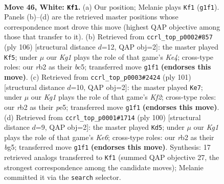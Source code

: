 \documentclass[11pt]{article}
\begin{document}
\clearpage

\begin{figure}[p]\centering
\begin{subfigure}{0.46\textwidth}\centering
\resizebox{\linewidth}{!}{%
\newchessgame
\chessboard[
  setfen={7k/8/8/4p1p1/5p2/5B2/1r6/6K1 w - - 3 46},
  showmover=false,
  pgfstyle=straightmove, color=movearrow, markmove={g1-f1}
]}
\caption{}
\end{subfigure}\hfill
\begin{subfigure}{0.46\textwidth}\centering
\resizebox{\linewidth}{!}{%
\newchessgame
\chessboard[
  setfen={6k1/2B5/8/2bP2p1/4K2p/8/8/8 w - - 0 54},
  showmover=false,
  pgfstyle=straightmove, color=movearrow, markmove={e4-f5}
]}
\caption{}
\end{subfigure}
\\[4pt]
\begin{subfigure}{0.46\textwidth}\centering
\resizebox{\linewidth}{!}{%
\newchessgame
\chessboard[
  setfen={8/5k2/8/4P2P/5b2/1K3P2/6P1/8 b - - 2 51},
  showmover=false,
  pgfstyle=straightmove, color=movearrow, markmove={f7-e7}
]}
\caption{}
\end{subfigure}\hfill
\begin{subfigure}{0.46\textwidth}\centering
\resizebox{\linewidth}{!}{%
\newchessgame
\chessboard[
  setfen={8/7k/4K3/1p4b1/2pB4/8/8/8 w - - 6 51},
  showmover=false,
  pgfstyle=straightmove, color=movearrow, markmove={e6-d5}
]}
\caption{}
\end{subfigure}
\caption{\textbf{Move 46, White: \texttt{Kf1}.} (a) Our position; Melanie plays \texttt{Kf1} (\texttt{g1f1}). Panels (b)--(d) are the retrieved master positions whose correspondence most drove this move (highest QAP objective among those that transfer to it). (b) Retrieved from \texttt{ccrl\_top\_p0002\#857} (ply 106) [structural distance $d$=12, QAP obj=2]: the master played \texttt{Kf5}; under $\mu$ our \emph{Kg1} plays the role of that game's \emph{Ke4}; cross-type roles: our \emph{r}b2 as their \emph{b}c5; transferred move \texttt{g1f1} \textbf{(endorses this move)}. (c) Retrieved from \texttt{ccrl\_top\_p0003\#2424} (ply 101) [structural distance $d$=10, QAP obj=2]: the master played \texttt{Ke7}; under $\mu$ our \emph{Kg1} plays the role of that game's \emph{Kf2}; cross-type roles: our \emph{r}b2 as their \emph{p}e5; transferred move \texttt{g1f1} \textbf{(endorses this move)}. (d) Retrieved from \texttt{ccrl\_top\_p0001\#1714} (ply 100) [structural distance $d$=9, QAP obj=2]: the master played \texttt{Kd5}; under $\mu$ our \emph{Kg1} plays the role of that game's \emph{Ke6}; cross-type roles: our \emph{r}b2 as their \emph{b}g5; transferred move \texttt{g1f1} \textbf{(endorses this move)}. Synthesis: 17 retrieved analogs transferred to \texttt{Kf1} (summed QAP objective 27, the strongest correspondence among the candidate moves); Melanie committed it via the \texttt{search} selector.}
\label{fig:thought-m90}
\end{figure}
\end{document}
